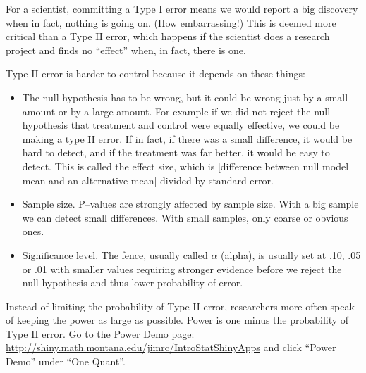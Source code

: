 For a scientist, committing a Type I error means we would report a
big discovery when in fact, nothing is going on. (How embarrassing!)
This is deemed more critical than a Type II error, which happens if
the scientist does a research project and finds no ``effect'' when, in
fact, there is one. 


Type II error is harder to control because it depends on these things:
\vspace{-.2cm}
\begin{itemize}
\item  The null hypothesis has to be wrong, but it could be wrong just
  by a small amount or by a large amount.  For example if 
   we did not reject the null hypothesis that treatment and
  control  were equally effective,  we could be making a type II
  error.  If in fact, if there was a small difference, it would be
  hard to detect, and if the treatment was far better, it would
  be easy to detect.  This is called the effect size, which is
  [difference between null model mean and an alternative mean] divided
  by standard error.
\item  Sample size.  P--values are strongly affected by sample
  size. With a big sample we can detect small differences.  With small
  samples, only coarse or obvious ones.
\item  Significance level.  The fence, usually called $\alpha$ (alpha), is
  usually set at .10, .05 or .01 with smaller values requiring
  stronger evidence before we reject the null hypothesis and thus
  lower probability of error.  
\end{itemize}


Instead of limiting the probability of Type II error, researchers more
often speak of keeping the power as large as possible.  Power is one
minus the probability of Type II error.  Go to the Power Demo page:
\url{http://shiny.math.montana.edu/jimrc/IntroStatShinyApps} and click
``Power Demo'' under ``One Quant''.
\begin{students}
\vspace{.5cm}
\end{students}


